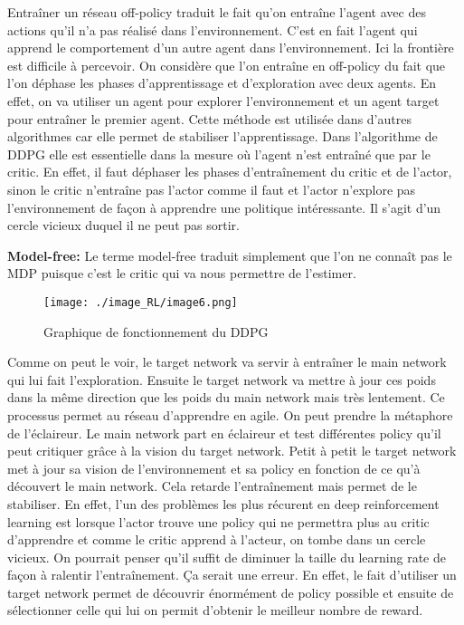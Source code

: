 Entraîner un réseau off-policy traduit le fait qu’on entraîne l’agent avec des actions qu’il n’a pas réalisé dans l’environnement. C’est en fait l’agent qui apprend le comportement d’un autre agent dans l’environnement.
Ici la frontière est difficile à percevoir. 
On considère que l’on entraîne en off-policy du fait que l’on déphase les phases d’apprentissage et d’exploration avec deux agents.
En effet, on va utiliser un agent pour explorer l’environnement et un agent target pour entraîner le premier agent.
Cette méthode est utilisée dans d’autres algorithmes car elle permet de stabiliser l’apprentissage.
Dans l’algorithme de DDPG elle est essentielle dans la mesure où l’agent n’est entraîné que par le critic.
En effet, il faut déphaser les phases d’entraînement du critic et de l’actor, sinon le critic n’entraîne pas l’actor comme il faut et l’actor n’explore pas l’environnement de façon à apprendre une politique intéressante. Il s’agit d’un cercle vicieux duquel il ne peut pas sortir.

\textbf{Model-free:}
Le terme model-free traduit simplement que l’on ne connaît pas le MDP puisque c’est le critic qui va nous permettre de l’estimer.


\begin{figure}[H]
    \centering
    \texttt{[image: ./image\_RL/image6.png]}
    \caption{  Graphique de fonctionnement du DDPG  }
\end{figure}

Comme on peut le voir, le target network va servir à entraîner le main network qui lui fait l’exploration. Ensuite le target network va mettre à jour ces poids dans la même direction que les poids du main network mais très lentement. Ce processus permet au réseau d’apprendre en agile. On peut prendre la métaphore de l’éclaireur. Le main network part en éclaireur et test différentes policy qu’il peut critiquer grâce à la vision du target network.
Petit à petit le target network met à jour sa vision de l’environnement et sa policy en fonction de ce qu’à découvert le main network.
Cela retarde l’entraînement mais permet de le stabiliser. En effet, l’un des problèmes les plus récurent en deep reinforcement learning est lorsque l’actor trouve une policy qui ne permettra plus au critic d’apprendre et comme le critic apprend à l’acteur, on tombe dans un cercle vicieux.
On pourrait penser qu’il suffit de diminuer la taille du learning rate de façon à ralentir l’entraînement. Ça serait une erreur.
En effet, le fait d’utiliser un target network permet de découvrir énormément de policy possible et ensuite de sélectionner celle qui lui on permit d’obtenir le meilleur nombre de reward.
\cite{CONT}